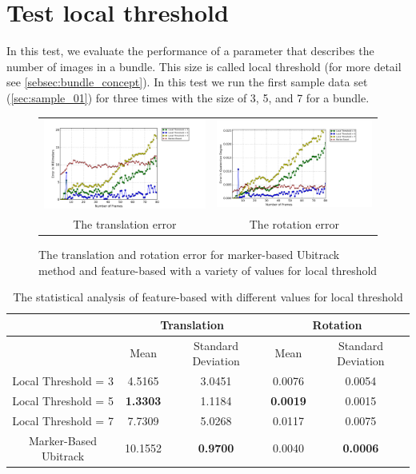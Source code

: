 \section{Test local threshold} \label{sec:local_threshold}
In this test, we evaluate the performance of a parameter that describes the number of images in a bundle. This size is called local threshold (for more detail see \autoref{sebsec:bundle_concept}). In this test we run the first sample data set (\autoref{sec:sample_01}) for three times with the size of 3, 5, and 7 for a bundle.
\begin{figure}[H]
\centering
\begin{tabular}{cc}
  \includegraphics[width=80mm]{figures/local/graph_translation} &   \includegraphics[width=80mm]{figures/local/graph_rotation}  \\
  The translation error & The rotation error \\[6pt]
\end{tabular}
\caption{The translation and rotation error for marker-based Ubitrack method and feature-based with a variety of values for local threshold}\label{fig:test_local_threshold}
\end{figure}

\begin{table}[H]
\centering
  \begin{tabular}{| c || c | c | c | c |}
      \hline
       & \multicolumn{2}{c|}{Translation} & \multicolumn{2}{c|}{Rotation} \\ \hline
       & Mean & Standard Deviation & Mean & Standard Deviation \\ \hline
      Local Threshold = 3 & 4.5165 & 3.0451 & 0.0076 & 0.0054 \\ \hline
      Local Threshold = 5 & \textbf{1.3303} & 1.1184 & \textbf{0.0019} & 0.0015 \\ \hline
      Local Threshold = 7 & 7.7309 & 5.0268 & 0.0117 & 0.0075 \\ \hline
      Marker-Based Ubitrack & 10.1552 & \textbf{0.9700} & 0.0040 & \textbf{0.0006} \\ \hline
  \end{tabular}
  \caption{The statistical analysis of feature-based with different values for local threshold} \label{tab:test_local_threshold}
\end{table}

